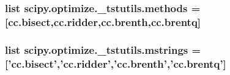 \subsubsection[{methods}]{\setlength{\rightskip}{0pt plus 5cm}list scipy.\+optimize.\+\_\+tstutils.\+methods = \mbox{[}{\bf cc.\+bisect},{\bf cc.\+ridder},{\bf cc.\+brenth},{\bf cc.\+brentq}\mbox{]}}\label{namespacescipy_1_1optimize_1_1__tstutils_a3a3b977dda41ffaa683edb0e9007da87}
\hypertarget{namespacescipy_1_1optimize_1_1__tstutils_a589f7892014d92e76de1f43602faf2ca}{}
\subsubsection[{mstrings}]{\setlength{\rightskip}{0pt plus 5cm}list scipy.\+optimize.\+\_\+tstutils.\+mstrings = \mbox{[}'{\bf cc.\+bisect}','{\bf cc.\+ridder}','{\bf cc.\+brenth}','{\bf cc.\+brentq}'\mbox{]}}\label{namespacescipy_1_1optimize_1_1__tstutils_a589f7892014d92e76de1f43602faf2ca}
